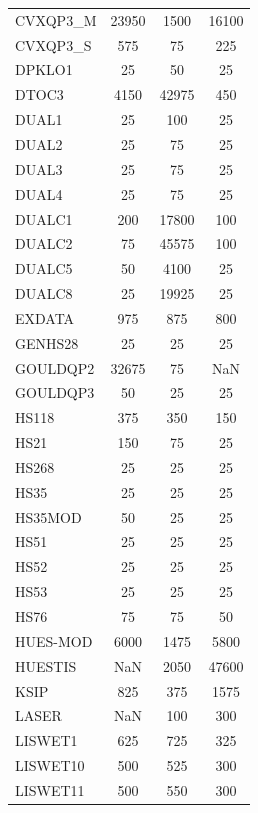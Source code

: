 \begin{longtable}{lccc}
CVXQP3\_M &    23950 &  1500 &    16100 \\
CVXQP3\_S &      575 &    75 &      225 \\
DPKLO1   &       25 &    50 &       25 \\
DTOC3    &     4150 & 42975 &      450 \\
DUAL1    &       25 &   100 &       25 \\
DUAL2    &       25 &    75 &       25 \\
DUAL3    &       25 &    75 &       25 \\
DUAL4    &       25 &    75 &       25 \\
DUALC1   &      200 & 17800 &      100 \\
DUALC2   &       75 & 45575 &      100 \\
DUALC5   &       50 &  4100 &       25 \\
DUALC8   &       25 & 19925 &       25 \\
EXDATA   &      975 &   875 &      800 \\
GENHS28  &       25 &    25 &       25 \\
GOULDQP2 &    32675 &    75 &      NaN \\
GOULDQP3 &       50 &    25 &       25 \\
HS118    &      375 &   350 &      150 \\
HS21     &      150 &    75 &       25 \\
HS268    &       25 &    25 &       25 \\
HS35     &       25 &    25 &       25 \\
HS35MOD  &       50 &    25 &       25 \\
HS51     &       25 &    25 &       25 \\
HS52     &       25 &    25 &       25 \\
HS53     &       25 &    25 &       25 \\
HS76     &       75 &    75 &       50 \\
HUES-MOD &     6000 &  1475 &     5800 \\
HUESTIS  &      NaN &  2050 &    47600 \\
KSIP     &      825 &   375 &     1575 \\
LASER    &      NaN &   100 &      300 \\
LISWET1  &      625 &   725 &      325 \\
LISWET10 &      500 &   525 &      300 \\
LISWET11 &      500 &   550 &      300 \\

\end{longtable}
